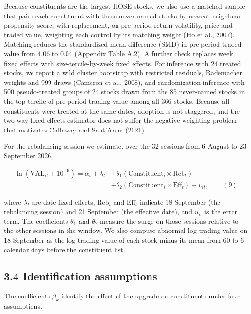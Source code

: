 \documentclass[review,authoryear,12pt]{elsarticle}
\begin{document}
Because constituents are the largest HOSE stocks, we also use a matched
sample that pairs each constituent with three never-named stocks by
nearest-neighbour propensity score, with replacement, on pre-period
return volatility, price and traded value, weighting each control by its
matching weight (Ho et al., 2007). Matching reduces the standardized
mean difference (SMD) in pre-period traded value from 4.06 to 0.04
(Appendix Table A.2). A further check replaces week fixed effects with
size-tercile-by-week fixed effects. For inference with 24 treated
stocks, we report a wild cluster bootstrap with restricted residuals,
Rademacher weights and 999 draws (Cameron et al., 2008), and
randomization inference with 500 pseudo-treated groups of 24 stocks
drawn from the 85 never-named stocks in the top tercile of pre-period
trading value among all 366 stocks. Because all constituents were
treated at the same dates, adoption is not staggered, and the two-way
fixed effects estimator does not suffer the negative-weighting problem
that motivates Callaway and Sant'Anna (2021).

For the rebalancing session we estimate, over the 32 sessions from 6
August to 23 September 2026,

\[\begin{aligned} \ln\left(\mathrm{VAL}_{it} + 10^{-6}\right) = \alpha_i + \lambda_t &+ \theta_1\left(\mathrm{Constituent}_i \times \mathrm{Reb}_t\right) \\ &+ \theta_2\left(\mathrm{Constituent}_i \times \mathrm{Eff}_t\right) + u_{it}, \qquad (9) \end{aligned}\]

where \(\lambda_t\) are date fixed effects, \(\mathrm{Reb}_t\) and
\(\mathrm{Eff}_t\) indicate 18 September (the rebalancing session) and
21 September (the effective date), and \(u_{it}\) is the error term. The
coefficients \(\theta_1\) and \(\theta_2\) measure the surge on those
sessions relative to the other sessions in the window. We also compute
abnormal log trading value on 18 September as the log trading value of
each stock minus its mean from 60 to 6 calendar days before the
constituent list.

\hypertarget{identification-assumptions}{%
\subsection*{3.4 Identification
assumptions}}

The coefficients \(\beta_k\) identify the effect of the upgrade on
constituents under four assumptions.
\end{document}
